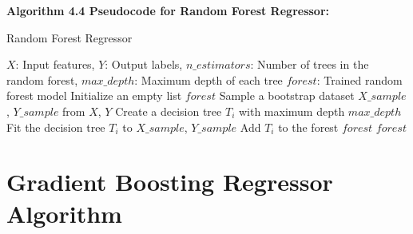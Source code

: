 \textbf{Algorithm 4.4 Pseudocode for Random Forest Regressor:}
\begin{algorithm}
\caption{Random Forest Regressor}
\begin{algorithmic}[1]
\Require $X$: Input features, $Y$: Output labels, $n\_estimators$: Number of trees in the random forest, $max\_depth$: Maximum depth of each tree
\Ensure $forest$: Trained random forest model
    \State Initialize an empty list $forest$
        \State Sample a bootstrap dataset $X\_sample$, $Y\_sample$ from $X$, $Y$
        \State Create a decision tree $T_i$ with maximum depth $max\_depth$
        \State Fit the decision tree $T_i$ to $X\_sample$, $Y\_sample$
        \State Add $T_i$ to the forest $forest$
    \EndFor
    \State \Return $forest$
\EndFunction
\end{algorithmic}
\end{algorithm}

\section{Gradient Boosting Regressor Algorithm}

